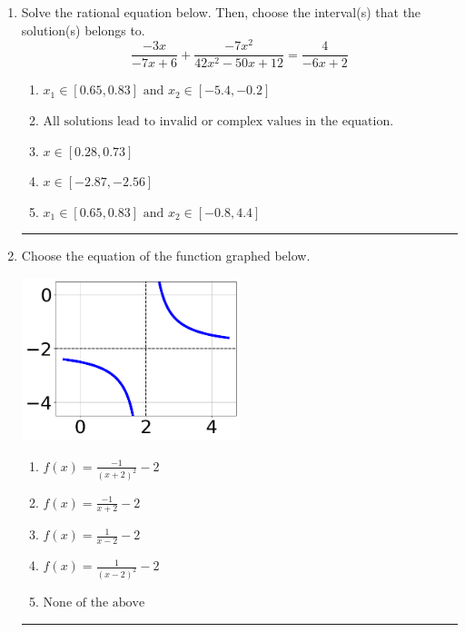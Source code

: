 \documentclass[14pt]{extbook}
\newcommand{\litem}[1]{\item#1\hspace*{-1cm}\rule{\textwidth}{0.4pt}}
\begin{document}
\begin{enumerate}
{\begin{enumerate}[label=\Alph*.]
\end{enumerate} }
\litem{
Solve the rational equation below. Then, choose the interval(s) that the solution(s) belongs to.\[ \frac{-3x}{-7x + 6} + \frac{-7x^{2}}{42x^{2} -50 x + 12} = \frac{4}{-6x + 2} \]\begin{enumerate}[label=\Alph*.]
\item \( x_1 \in [0.65, 0.83] \text{ and } x_2 \in [-5.4,-0.2] \)
\item \( \text{All solutions lead to invalid or complex values in the equation.} \)
\item \( x \in [0.28,0.73] \)
\item \( x \in [-2.87,-2.56] \)
\item \( x_1 \in [0.65, 0.83] \text{ and } x_2 \in [-0.8,4.4] \)

\end{enumerate} }
\litem{
Choose the equation of the function graphed below.
\begin{center}
    \includegraphics[width=0.5\textwidth]{../Figures/rationalGraphToEquationC.png}
\end{center}
\begin{enumerate}[label=\Alph*.]
\item \( f(x) = \frac{-1}{(x + 2)^2} - 2 \)
\item \( f(x) = \frac{-1}{x + 2} - 2 \)
\item \( f(x) = \frac{1}{x - 2} - 2 \)
\item \( f(x) = \frac{1}{(x - 2)^2} - 2 \)
\item \( \text{None of the above} \)


\end{enumerate}}
\end{enumerate}
\end{document}
